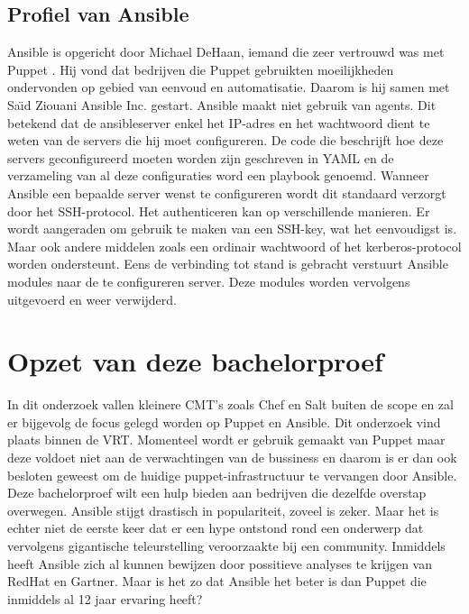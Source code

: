 \subsection{Profiel van Ansible}
Ansible is opgericht door Michael DeHaan, iemand die zeer vertrouwd was met Puppet \autocite{ansiblefordevops}. Hij vond dat bedrijven die Puppet gebruikten moeilijkheden ondervonden op gebied van eenvoud en automatisatie. Daarom is hij samen met Sa{\"\i}d Ziouani Ansible Inc. gestart. 
Ansible maakt niet gebruik van agents. Dit betekend dat de ansibleserver enkel het IP-adres en het wachtwoord dient te weten van de servers die hij moet configureren. De code die beschrijft hoe deze servers geconfigureerd moeten worden zijn geschreven in YAML en de verzameling van al deze configuraties word een playbook genoemd. Wanneer Ansible een bepaalde server wenst te configureren wordt dit standaard verzorgt door het SSH-protocol. Het authenticeren kan op verschillende manieren. Er wordt aangeraden om gebruik te maken van een SSH-key, wat het eenvoudigst is. Maar ook andere middelen zoals een ordinair wachtwoord of het kerberos-protocol worden ondersteunt. Eens de verbinding tot stand is gebracht verstuurt Ansible modules naar de te configureren server. Deze modules worden vervolgens uitgevoerd en weer verwijderd. \autocite{ansibledoc}







\section{Opzet van deze bachelorproef}
\label{sec:opzet-bachelorproef}

In dit onderzoek vallen kleinere CMT's zoals Chef en Salt buiten de scope en zal er bijgevolg de focus gelegd worden op Puppet en Ansible. Dit onderzoek vind plaats binnen de VRT. Momenteel wordt er gebruik gemaakt van Puppet maar deze voldoet niet aan de verwachtingen van de bussiness en daarom is er dan ook besloten geweest om de huidige puppet-infrastructuur te vervangen door Ansible.
Deze bachelorproef wilt een hulp bieden aan bedrijven die dezelfde overstap overwegen. Ansible stijgt drastisch in populariteit, zoveel is zeker. Maar het is echter niet de eerste keer dat er een hype ontstond rond een onderwerp dat vervolgens gigantische teleurstelling veroorzaakte bij een community. Inmiddels heeft Ansible zich al kunnen bewijzen door possitieve analyses te krijgen van RedHat en Gartner. Maar is het zo dat Ansible het beter is dan Puppet die inmiddels al 12 jaar ervaring heeft?




